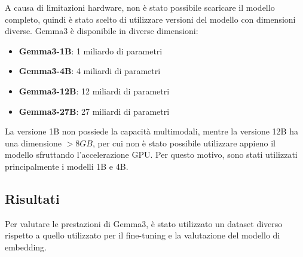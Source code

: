 A causa di limitazioni hardware, non è stato possibile
scaricare il modello completo, quindi è stato scelto di
utilizzare versioni del modello con dimensioni diverse.
Gemma3 è disponibile in diverse dimensioni:

\begin{itemize}
  \item \textbf{Gemma3-1B}: 1 miliardo di parametri
  \item \textbf{Gemma3-4B}: 4 miliardi di parametri
  \item \textbf{Gemma3-12B}: 12 miliardi di parametri
  \item \textbf{Gemma3-27B}: 27 miliardi di parametri
\end{itemize}

La versione 1B non possiede la capacità multimodali, mentre
la versione 12B ha una dimensione $>8GB$, per cui non è
stato possibile utilizzare appieno il modello sfruttando
l'accelerazione GPU.
Per questo motivo, sono stati utilizzati principalmente i
modelli 1B e 4B.

\subsection{Risultati}
\label{sec:gemma3_results}

Per valutare le prestazioni di Gemma3, è stato utilizzato
un dataset diverso rispetto a quello utilizzato per il
fine-tuning e la valutazione del modello di embedding.

